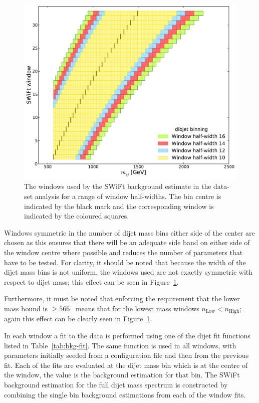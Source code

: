\vspace{-1em}
\begin{figure}[!htb]
\centering
\includegraphics[width=0.75\linewidth, angle=0]{figs/Dibjet/LowMass/evt-swiftBins_min566_fl0_fh0_tr0.pdf}
\vspace{-0.5em}
\caption[The windows used by the SWiFt background estimate in the \lm{} data-set analysis for a range of window half-widths.]
        {\label{fig:bkg-lm_swiftBins}
  The windows used by the SWiFt background estimate in the \lm{} data-set analysis for a range of window half-widths.
  The bin centre is indicated by the black mark and the corresponding window is indicated by the coloured squares.}
\end{figure}

Windows symmetric in the number of dijet mass bins either side of the center are chosen
as this ensures that there will be an adequate side band on either side of the window centre where possible
and reduces the number of parameters that have to be tested.
For clarity, it should be noted that because the width of the dijet mass bins is not uniform, the windows used are not exactly symmetric with respect to dijet mass;
this effect can be seen in Figure~\ref{fig:bkg-lm_swiftBins}.

Furthermore, it must be noted that enforcing the requirement that the lower mass bound is $\geq566$~\GeV{}
means that for the lowest mass windows $n_{\text{Low}} < n_{\text{High}}$;
again this effect can be clearly seen in Figure~\ref{fig:bkg-lm_swiftBins}.

In each window a fit to the data is performed using one of the dijet fit functions listed in Table~\ref{tab:bkg-fit}.
The same function is used in all windows, with parameters initially seeded from a configuration file and then from the previous fit.
Each of the fits are evaluated at the dijet mass bin which is at the centre of the window, the value is the background estimation for that bin.
The SWiFt background estimation for the full dijet mass spectrum is constructed by combining the single bin background estimations from each of the window fits.

